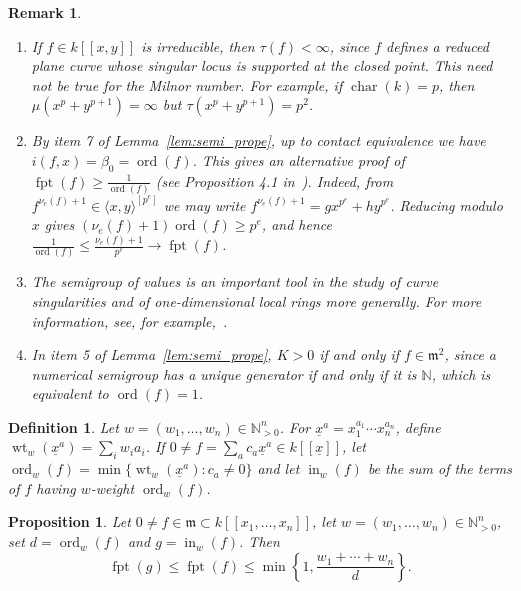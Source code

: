 \documentclass{article}
\newtheorem{definition}[theorem]{Definition}
\newtheorem{proposition}[theorem]{Proposition}
\newtheorem{remark}[theorem]{Remark}
\DeclareMathOperator{\ord}{ord}
\DeclareMathOperator{\fpt}{fpt}
\numberwithin{theorem}{section}
\begin{document}
\begin{remark}\label{rem:2dim_sing}
\begin{enumerate}
    \item \textup{If $f\in k[[x,y]]$ is irreducible, then $\tau(f)<\infty$, since $f$ defines a reduced plane curve whose singular locus is supported at the closed point. This need not be true for the Milnor number. For example, if $\operatorname{char}(k)=p$, then $\mu(x^p+y^{p+1})=\infty$ but $\tau(x^p+y^{p+1})=p^2$.}
    \item \textup{By item 7 of Lemma~\ref{lem:semi_prope}, up to contact equivalence we have $i(f,x)=\beta_0=\ord(f)$. This gives an alternative proof of $\fpt(f)\geq \frac{1}{\ord(f)}$ (see Proposition 4.1 in~\cite{takagi2004f}). Indeed, from $f^{\nu_e(f)+1}\in\langle x,y\rangle^{[p^e]}$ we may write $f^{\nu_e(f)+1}=gx^{p^e}+hy^{p^e}$. Reducing modulo $x$ gives $(\nu_e(f)+1)\ord(f)\geq p^e$, and hence $\frac{1}{\ord(f)}\leq\frac{\nu_e(f)+1}{p^e}\to\fpt(f)$.}
    \item \textup{The semigroup of values is an important tool in the study of curve singularities and of one-dimensional local rings more generally. For more information, see, for example,~\cite{assi2020numerical,barroso2012approach,barroso2022note,castellanos2005semigroup,campillo1994gorenstein,d2025value,de1987semigroup,kunz1970value,zariski2006moduli}.}
    \item \textup{In item 5 of Lemma~\ref{lem:semi_prope}, $K>0$ if and only if $f\in\mathfrak{m}^2$, since a numerical semigroup has a unique generator if and only if it is $\mathbb{N}$, which is equivalent to $\ord(f)=1$.}
\end{enumerate}
\end{remark}

\begin{definition}\label{def:weighted_initial}
Let $w=(w_1,\dots,w_n)\in\mathbb{N}_{>0}^n$. For $\underline{x}^a=x_1^{a_1}\cdots x_n^{a_n}$, define $\operatorname{wt}_w(\underline{x}^a)=\sum_iw_i a_i$. If $0\neq f=\sum_a c_a\underline{x}^a\in k[[\underline{x}]]$, let $\ord_w(f)=\min\{\operatorname{wt}_w(\underline{x}^a):c_a\neq0\}$ and let $\operatorname{in}_w(f)$ be the sum of the terms of $f$ having $w$-weight $\ord_w(f)$.
\end{definition}

\begin{proposition}\label{prop:weighted_fpt}
Let $0\neq f\in\mathfrak{m}\subset k[[x_1,\dots,x_n]]$, let $w=(w_1,\dots,w_n)\in\mathbb{N}_{>0}^n$, set $d=\ord_w(f)$ and $g=\operatorname{in}_w(f)$. Then
\[
    \fpt(g)\leq\fpt(f)\leq
    \min\left\{1,\frac{w_1+\cdots+w_n}{d}\right\}.
\]
\end{proposition}
\end{document}
